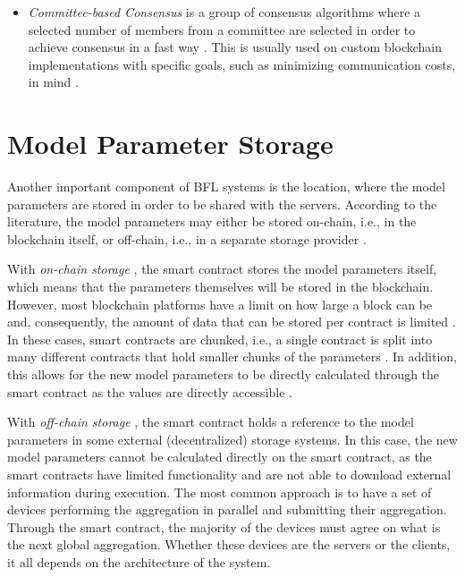 \begin{itemize}
    \item \textit{Committee-based Consensus} is a group of consensus algorithms where a selected number of members from a committee are selected in order to achieve consensus in a fast way \cite{qu_blockchain-enabled_2022}. This is usually used on custom blockchain implementations with specific goals, such as minimizing communication costs, in mind \cite{9293091}.
\end{itemize}

\section{Model Parameter Storage}\label{related_work:param_storage}

Another important component of BFL systems is the location, where the model parameters are stored in order to be shared with the servers. According to the literature, the model parameters may either be stored on-chain, i.e., in the blockchain itself, or off-chain, i.e., in a separate storage provider \cite{10.48550/arxiv.2104.10501}.

With \textit{on-chain storage} \cite{9274451, baffle, demo, 8733825, 9524833, 8894364, 9184854, 8893114}, the smart contract stores the model parameters itself, which means that the parameters themselves will be stored in the blockchain. However, most blockchain platforms have a limit on how large a block can be and, consequently, the amount of data that can be stored per contract is limited \cite{9274451}. In these cases, smart contracts are chunked, i.e., a single contract is split into many different contracts that hold smaller chunks of the parameters \cite{baffle}. In addition, this allows for the new model parameters to be directly calculated through the smart contract as the values are directly accessible  \cite{9274451}.
    
With \textit{off-chain storage} \cite{10.1145/3319535.3363256, 10.48550/arxiv.2011.07516, 8945913, 10.48550/arxiv.2202.02817, 10.48550/arxiv.2007.03856, 10.48550/arxiv.1910.12603, Peyvandi2022, 9170559}, the smart contract holds a reference to the model parameters in some external (decentralized) storage systems. In this case, the new model parameters cannot be calculated directly on the smart contract, as the smart contracts have limited functionality and are not able to download external information during execution. The most common approach is to have a set of devices performing the aggregation in parallel and submitting their aggregation. Through the smart contract, the majority of the devices must agree on what is the next global aggregation. Whether these devices are the servers or the clients, it all depends on the architecture of the system.


